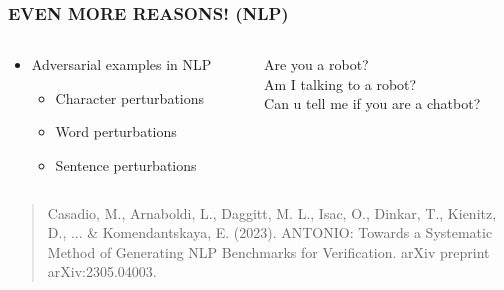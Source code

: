 \documentclass[t,compress,aspectratio=169]{beamer}
\begin{document}
\begin{frame}
\frametitle{EVEN MORE REASONS! (NLP)}

\begin{columns}[c]
    \begin{column}{.5\textwidth}
        \begin{itemize}    \Large

            \item Adversarial examples in NLP
            \begin{itemize}    \Large

                \item Character perturbations
                \item Word perturbations
                \item \textcolor{aisecred}{Sentence perturbations}
            \end{itemize}
        \end{itemize}
    \end{column}
    \begin{column}{.5\textwidth}
    \begin{center}    \Large

        \textcolor{aisecpurple}{Are you a robot?}\\
        \textcolor{aisecred}{Am I talking to }\textcolor{aisecpurple}{a robot?}\\
        \textcolor{aisecred}{Can u tell me if you are a chatbot?}
    \end{center}
    \end{column}
\end{columns}
\vfill
	\begin{quote}
		\tiny Casadio, M., {{Arnaboldi, L.}}, Daggitt, M. L., Isac, O., Dinkar, T., Kienitz, D., ... \& Komendantskaya, E. (2023). ANTONIO: Towards a Systematic Method of Generating NLP Benchmarks for Verification. arXiv preprint arXiv:2305.04003.

	\end{quote}
\end{frame}
\end{document}
